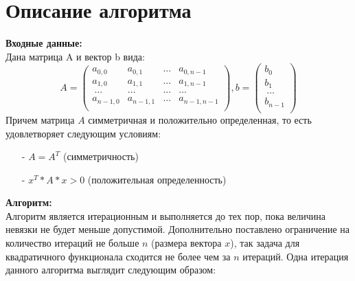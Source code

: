 \documentclass[14pt, russian]{extarticle}
\begin{document}
        \newpage

        \section{Описание алгоритма}
        {\noindent\textbf{Входные данные:}\\\indent}
        Дана матрица A и вектор b вида:
        \begin{equation} 
         A=
           \begin{pmatrix}
                a_{0,0} &  a_{0,1} & ... & a_{0,n-1}\\
                a_{1,0} & a_{1,1} & ... & a_{1,n-1}\\
                \ ...  & ... &  ... &  ... \\
                a_{n-1,0} & a_{n-1,1} & ... & a_{n-1,n-1}\\
           \end{pmatrix}
         , b= 
           \begin{pmatrix}
                b_{0} \\
                b_{1} \\
                \ ...  \\
                b_{n-1} \\
          \end{pmatrix}
        \end{equation}  
        Причем матрица ${A}$ симметричная и положительно определенная, то есть удовлетворяет следующим условиям: 
        \begin{itemize}
            \item[-] $A = A^{T}$ (симметричность)
            \item[-] $x^{T}*A*x > 0$ (положительная определенность)
        \end{itemize}
        {\noindent\textbf{Алгоритм:}\\\indent}
        Алгоритм является итерационным и выполняется до тех пор, пока величина невязки не будет меньше допустимой. Дополнительно поставлено ограничение на количество итераций не больше $n$ (размера вектора $x$), так задача для квадратичного функционала сходится не более чем за $n$ итераций. Одна итерация данного алгоритма выглядит следующим образом:
\end{document}
